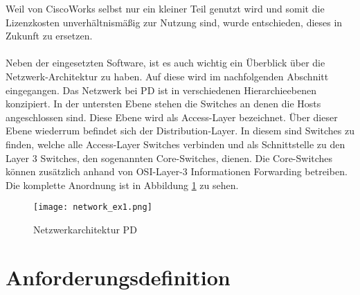 Weil von CiscoWorks selbst nur ein kleiner Teil genutzt wird und somit die Lizenzkosten unverhältnismäßig zur Nutzung sind, wurde entschieden, dieses in Zukunft zu ersetzen.\\\\
Neben der eingesetzten Software, ist es auch wichtig ein Überblick über die Netzwerk-Architektur zu haben.
Auf diese wird im nachfolgenden Abschnitt eingegangen.
Das Netzwerk bei PD ist in verschiedenen Hierarchieebenen konzipiert.
In der untersten Ebene stehen die Switches an denen die Hosts angeschlossen sind. Diese Ebene wird als Access-Layer bezeichnet.
Über dieser Ebene wiederrum befindet sich der Distribution-Layer. In diesem sind Switches zu finden, welche alle Access-Layer Switches verbinden und als Schnittstelle zu den Layer 3 Switches, den sogenannten Core-Switches, dienen.
Die Core-Switches können zusätzlich anhand von OSI-Layer-3 Informationen Forwarding betreiben.
Die komplette Anordnung ist in Abbildung \ref{fig:network_ex1} zu sehen.

\begin{figure}[H]
\centering
\texttt{[image: network\_ex1.png]}
\caption{Netzwerkarchitektur PD}
\label{fig:network_ex1}
\end{figure}

\section{Anforderungsdefinition}
\label{sec:anfdef}

